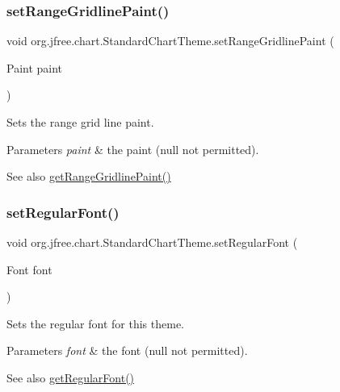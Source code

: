 \subsubsection{\texorpdfstring{set\+Range\+Gridline\+Paint()}{setRangeGridlinePaint()}}
{\footnotesize\ttfamily void org.\+jfree.\+chart.\+Standard\+Chart\+Theme.\+set\+Range\+Gridline\+Paint (\begin{DoxyParamCaption}\item[{Paint}]{paint }\end{DoxyParamCaption})}

Sets the range grid line paint.


\begin{DoxyParams}{Parameters}
{\em paint} & the paint ({\ttfamily null} not permitted).\\
\hline
\end{DoxyParams}
\begin{DoxySeeAlso}{See also}
\mbox{\hyperlink{classorg_1_1jfree_1_1chart_1_1_standard_chart_theme_a8f0db366a4b79b42137e65498d23e41f}{get\+Range\+Gridline\+Paint()}} 
\end{DoxySeeAlso}
\mbox{\label{classorg_1_1jfree_1_1chart_1_1_standard_chart_theme_ae3327471f36e9858487df4e1ef36d9e3}} 
\subsubsection{\texorpdfstring{set\+Regular\+Font()}{setRegularFont()}}
{\footnotesize\ttfamily void org.\+jfree.\+chart.\+Standard\+Chart\+Theme.\+set\+Regular\+Font (\begin{DoxyParamCaption}\item[{Font}]{font }\end{DoxyParamCaption})}

Sets the regular font for this theme.


\begin{DoxyParams}{Parameters}
{\em font} & the font ({\ttfamily null} not permitted).\\
\hline
\end{DoxyParams}
\begin{DoxySeeAlso}{See also}
\mbox{\hyperlink{classorg_1_1jfree_1_1chart_1_1_standard_chart_theme_a588cc2cf8dff888884e79ed24adafeba}{get\+Regular\+Font()}} 
\end{DoxySeeAlso}
\mbox{\label{classorg_1_1jfree_1_1chart_1_1_standard_chart_theme_a0ff8611c67fdb30d2cc36ab4d568b6f5}} 
